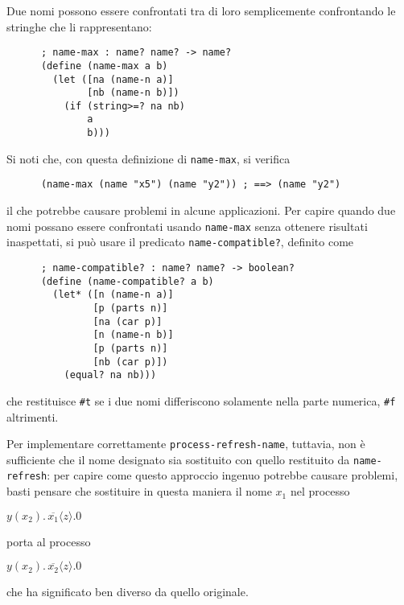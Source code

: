 Due nomi possono essere confrontati tra di loro semplicemente confrontando
le stringhe che li rappresentano:

\begin{lstlisting}
      ; name-max : name? name? -> name?
      (define (name-max a b)
        (let ([na (name-n a)]
              [nb (name-n b)])
          (if (string>=? na nb)
              a
              b)))
\end{lstlisting}

Si noti che, con questa definizione di \lstinline{name-max}, si verifica

\begin{lstlisting}
      (name-max (name "x5") (name "y2")) ; ==> (name "y2")
\end{lstlisting}

il che potrebbe causare problemi in alcune applicazioni. Per capire quando
due nomi possano essere confrontati usando \lstinline{name-max} senza
ottenere risultati inaspettati, si pu\`o usare il predicato
\lstinline{name-compatible?}, definito come

\begin{lstlisting}
      ; name-compatible? : name? name? -> boolean?
      (define (name-compatible? a b)
        (let* ([n (name-n a)]
               [p (parts n)]
               [na (car p)]
               [n (name-n b)]
               [p (parts n)]
               [nb (car p)])
          (equal? na nb)))
\end{lstlisting}

che restituisce \lstinline{#t} se i due nomi differiscono solamente nella
parte numerica, \lstinline{#f} altrimenti.

Per implementare correttamente \lstinline{process-refresh-name}, tuttavia,
non \`e sufficiente che il nome designato sia sostituito con quello
restituito da \lstinline{name-refresh}: per capire come questo approccio
ingenuo potrebbe causare problemi, basti pensare che sostituire in questa
maniera il nome $x_1$ nel processo

\begin{pilisting}
$
    y(x_2) . \, \overline{x_1}\langle z\rangle . 0
$
\end{pilisting}

porta al processo

\begin{pilisting}
$
    y(x_2) . \, \overline{x_2}\langle z\rangle . 0
$
\end{pilisting}

che ha significato ben diverso da quello originale.

